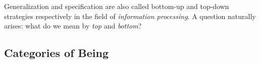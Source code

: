 
Generalization and specification are also called bottom-up and top-down strategies respectively in the field of \textit{information processing}. A question naturally arises: what do we mean by \textit{top} and \textit{bottom}? \\






\subsection{Categories of Being}

